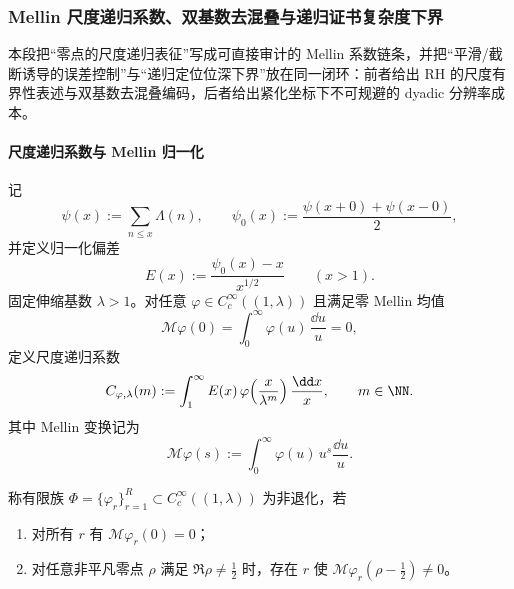 \subsubsection{Mellin 尺度递归系数、双基数去混叠与递归证书复杂度下界}\label{subsubsec:xi-mellin-scale-recursion-bohr-dealiasing}
本段把“零点的尺度递归表征”写成可直接审计的 Mellin 系数链条，并把“平滑/截断诱导的误差控制”与“递归定位位深下界”放在同一闭环：前者给出 RH 的尺度有界性表述与双基数去混叠编码，后者给出紧化坐标下不可规避的 dyadic 分辨率成本。

\paragraph{尺度递归系数与 Mellin 归一化}
记
\[
\psi(x):=\sum_{n\le x}\Lambda(n),\qquad
\psi_0(x):=\frac{\psi(x+0)+\psi(x-0)}{2},
\]
并定义归一化偏差
\[
E(x):=\frac{\psi_0(x)-x}{x^{1/2}}\qquad (x>1).
\]
固定伸缩基数 \(\lambda>1\)。对任意 \(\varphi\in C_c^\infty((1,\lambda))\) 且满足零 Mellin 均值
\[
\mathcal M\varphi(0)=\int_0^\infty \varphi(u)\,\frac{\dd u}{u}=0,
\]
定义尺度递归系数
\[
C_{\varphi,\lambda}(m):=
\int_1^\infty E(x)\,\varphi\!\left(\frac{x}{\lambda^m}\right)\frac{\dd x}{x},
\qquad m\in\NN.
\]
其中 Mellin 变换记为
\[
\mathcal M\varphi(s):=\int_0^\infty \varphi(u)\,u^s\frac{\dd u}{u}.
\]

称有限族 \(\Phi=\{\varphi_r\}_{r=1}^R\subset C_c^\infty((1,\lambda))\) 为非退化，若
\begin{enumerate}
  \item 对所有 \(r\) 有 \(\mathcal M\varphi_r(0)=0\)；
  \item 对任意非平凡零点 \(\rho\) 满足 \(\Re\rho\neq \frac12\) 时，存在 \(r\) 使
  \(\mathcal M\varphi_r(\rho-\frac12)\neq 0\)。
\end{enumerate}

